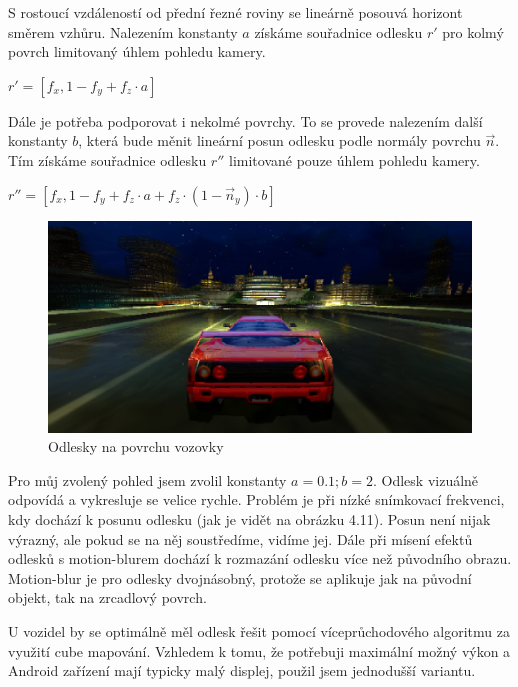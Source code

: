 \documentclass[11pt,twoside,a4paper]{book}
\begin{document}
S rostoucí vzdáleností od přední řezné roviny se lineárně posouvá horizont směrem vzhůru. Nalezením konstanty $a$ získáme souřadnice odlesku $r'$ pro kolmý povrch limitovaný úhlem pohledu kamery.
\begin{center}
$r' = [f_x, 1 - f_y + f_z \cdot a]$
\end{center}

Dále je potřeba podporovat i nekolmé povrchy. To se provede nalezením další konstanty $b$, která bude měnit lineární posun odlesku podle normály povrchu $\vec{n}$. Tím získáme souřadnice odlesku $r''$ limitované pouze úhlem pohledu kamery.
\begin{center}
$r'' = [f_x, 1 - f_y + f_z \cdot a + f_z \cdot (1 - \vec{n}_y) \cdot b]$
\end{center}

\begin{center}
\begin{figure}[h!]
\includegraphics[width=130mm]{figures/reflect-horizont.png}
\caption{Odlesky na povrchu vozovky}
\end{figure}
\end{center}

Pro můj zvolený pohled jsem zvolil konstanty $a = 0.1; b = 2$. Odlesk vizuálně odpovídá a vykresluje se velice rychle. Problém je při nízké snímkovací frekvenci, kdy dochází k posunu odlesku (jak je vidět na obrázku 4.11). Posun není nijak výrazný, ale pokud se na něj soustředíme, vidíme jej. Dále při mísení efektů odlesků s motion-blurem dochází k rozmazání odlesku více než původního obrazu. Motion-blur je pro odlesky dvojnásobný, protože se aplikuje jak na původní objekt, tak na zrcadlový povrch.
\bigskip

U vozidel by se optimálně měl odlesk řešit pomocí víceprůchodového algoritmu za využití cube mapování. Vzhledem k tomu, že potřebuji maximální možný výkon a Android zařízení mají typicky malý displej, použil jsem jednodušší variantu.
\end{document}
